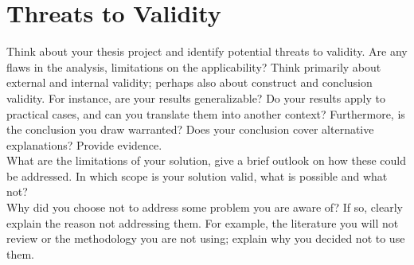 \section*{Threats to Validity}

Think about your thesis project and identify potential threats to validity. Are any flaws in the analysis, limitations on the applicability? Think primarily about external and internal validity; perhaps also about construct and conclusion validity. For instance, are your results generalizable? Do your results apply to practical cases, and can you translate them into another context? Furthermore, is the conclusion you draw warranted? Does your conclusion cover alternative explanations? Provide evidence.\\

\noindent What are the limitations of your solution, give a brief outlook on how these could be addressed. In which scope is your solution valid, what is possible and what not?\\

\noindent Why did you choose not to address some problem you are aware of? If so, clearly explain the reason not addressing them. For example, the literature you will not review or the methodology you are not using; explain why you decided not to use them.

